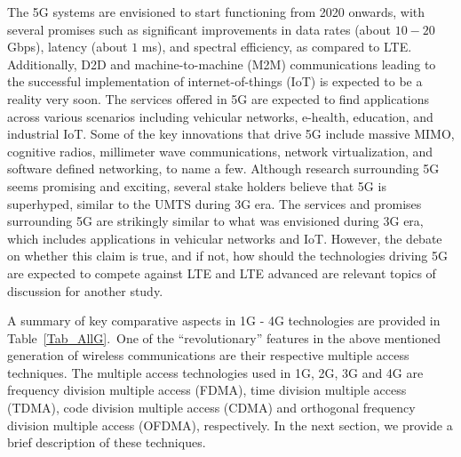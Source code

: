 \begin{multicols}{2}
The 5G systems are envisioned to start functioning from 2020 onwards, with several promises such as significant improvements in data rates (about $10-20$ Gbps), latency (about $1$ ms), and spectral efficiency, as compared to LTE. Additionally, D2D and machine-to-machine (M2M) communications leading to the successful implementation of internet-of-things (IoT) is expected to be a reality very soon. The services offered in 5G are expected to find applications across various scenarios including vehicular networks, e-health, education, and industrial IoT. Some of the key innovations that drive 5G include massive MIMO, cognitive radios, millimeter wave communications, network virtualization, and software defined networking, to name a few. Although research surrounding 5G seems promising and exciting, several stake holders believe that 5G is superhyped, similar to the UMTS during 3G era. The services and promises surrounding 5G are strikingly similar to what was envisioned during 3G era, which includes applications in vehicular networks and IoT. However, the debate on whether this claim is true, and if not, how should the technologies driving 5G are expected to compete against LTE and LTE advanced are relevant topics of discussion for another study.

A summary of key comparative aspects in 1G - 4G technologies are provided in Table~\ref{Tab_AllG}.~One of the ``revolutionary'' features in the above mentioned generation of wireless communications are their respective multiple access techniques. The multiple access technologies used in 1G, 2G, 3G and 4G are frequency division multiple access (FDMA), time division multiple access (TDMA), code division multiple access (CDMA) and orthogonal frequency division multiple access (OFDMA), respectively. In the next section, we provide a brief description of these techniques.
\end{multicols} 

